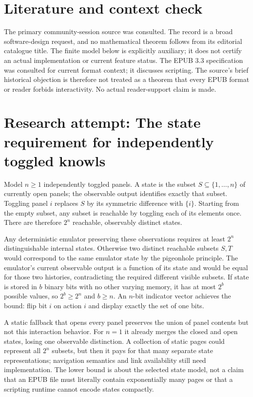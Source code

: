 \documentclass[11pt]{article}
\begin{document}
\section{Literature and context check}
The primary community-session source was consulted. The record is a broad software-design request, and no mathematical theorem follows from its editorial catalogue title. The finite model below is explicitly auxiliary; it does not certify an actual implementation or current feature status. The EPUB 3.3 specification was consulted for current format context; it discusses scripting. The source's brief historical objection is therefore not treated as a theorem that every EPUB format or reader forbids interactivity. No actual reader-support claim is made.
\section{Research attempt: The state requirement for independently toggled knowls}
Model $n\ge1$ independently toggled panels. A state is the subset $S\subseteq\{1,\ldots,n\}$ of currently open panels; the observable output identifies exactly that subset. Toggling panel $i$ replaces $S$ by its symmetric difference with $\{i\}$. Starting from the empty subset, any subset is reachable by toggling each of its elements once. There are therefore $2^n$ reachable, observably distinct states.

Any deterministic emulator preserving these observations requires at least $2^n$ distinguishable internal states. Otherwise two distinct reachable subsets $S,T$ would correspond to the same emulator state by the pigeonhole principle. The emulator's current observable output is a function of its state and would be equal for those two histories, contradicting the required different visible subsets. If state is stored in $b$ binary bits with no other varying memory, it has at most $2^b$ possible values, so $2^b\ge2^n$ and $b\ge n$. An $n$-bit indicator vector achieves the bound: flip bit $i$ on action $i$ and display exactly the set of one bits.

A static fallback that opens every panel preserves the union of panel contents but not this interaction behavior. For $n=1$ it already merges the closed and open states, losing one observable distinction. A collection of static pages could represent all $2^n$ subsets, but then it pays for that many separate state representations; navigation semantics and link availability still need implementation. The lower bound is about the selected state model, not a claim that an EPUB file must literally contain exponentially many pages or that a scripting runtime cannot encode states compactly.
\end{document}
